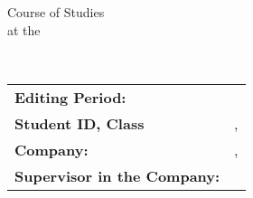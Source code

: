 \begin{titlepage}

\hspace{-2cm}
\begin{tabular}{m{9cm}m{2cm}m{10cm}}
\end{tabular} 

\normalsize

\vspace{22mm}

\begin{center}
	\large{\textbf{\type}}

	\vspace{18mm}

	Course of Studies \courseOfStudies \\
	at the \universityName \\

	\vspace{18mm}

	\textbf{\Large{\thetitle}} 

	\vspace{22mm}

	\large{\theauthor} \\

	\textit{\dayOfCompletion}

	\vspace{50mm}

\end{center}

\begin{tabular}{p{6cm}l}
	\textbf{Editing Period:} & \timeOfProject \\
	\textbf{Student ID, Class} & \enrolmentNumber, \className \\
	\textbf{Company:} & \companyName, \companyCity \\
	\textbf{Supervisor in the Company:} & \supervisorName 
\end{tabular}

\end{titlepage}
